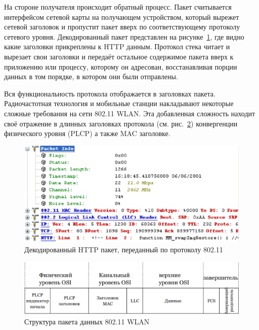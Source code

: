 На стороне получателя происходит обратный процесс. Пакет считывается интерфейсом
сетевой карты на получающем устройством, который вырежет сетевой заголовок и
пропустит пакет вверх по соответствующему протоколу сетевого уровня.
Декодированный пакет представлен на рисунке~\ref{fig:wifi_packet_in_sniffer},
где видно какие заголовки прикреплены к HTTP данным. Протокол стека читает и
вырезает свои заголовки и передаёт остальное содержимое пакета вверх к
приложению или процессу, которому он адресован, восстанавливая порции данных в
том порядке, в котором они были отправлены.

Вся функциональность протокола отображается в заголовках пакета. Радиочастотная
технология и мобильные станции накладывают некоторые сложные требования на сети
802.11 WLAN. Эта добавленная сложность находит своё отражение в длинных
заголовках протокола (см. рис.~\ref{fig:wlan_data_packet_structure}) конвергенции
физического уровня (PLCP) а также MAC заголовке.

\begin{figure}
    \includegraphics[width=150mm]{graphics/wifi_packet_in_sniffer.eps}
    \caption{Декодированный HTTP пакет, переданный по протоколу 802.11}
    \label{fig:wifi_packet_in_sniffer}
\end{figure}

\begin{figure}
    \includegraphics[width=1\textwidth]{graphics/wlan_data_packet_structure.eps}
    \caption{Структура пакета данных 802.11 WLAN}
    \label{fig:wlan_data_packet_structure}
\end{figure}

